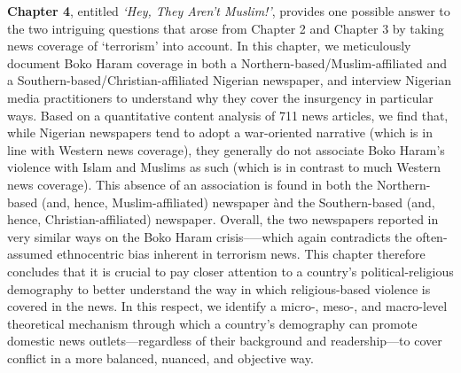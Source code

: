 \textbf{Chapter 4}, entitled \textit{`Hey, They Aren't Muslim!'}, provides one possible answer to the two intriguing questions that arose from Chapter 2 and Chapter 3 by taking news coverage of `terrorism' into account. In this chapter, we meticulously document Boko Haram coverage in both a Northern-based/Muslim-affiliated and a Southern-based/Christian-affiliated Nigerian newspaper, and interview Nigerian media practitioners to understand why they cover the insurgency in particular ways. Based on a quantitative content analysis of 711 news articles, we find that, while Nigerian newspapers tend to adopt a war-oriented narrative (which is in line with Western news coverage), they generally do not associate Boko Haram's violence with Islam and Muslims as such (which is in contrast to much Western news coverage). This absence of an association is found in both the Northern-based (and, hence, Muslim-affiliated) newspaper ànd the Southern-based (and, hence, Christian-affiliated) newspaper. Overall, the two newspapers reported in very similar ways on the Boko Haram crisis--—which again contradicts the often-assumed ethnocentric bias inherent in terrorism news. This chapter therefore concludes that it is crucial to pay closer attention to a country’s political-religious demography to better understand the way in which religious-based violence is covered in the news. In this respect, we identify a micro-, meso-, and macro-level theoretical mechanism through which a country’s demography can promote domestic news outlets—regardless of their background and readership—to cover conflict in a more balanced, nuanced, and objective way.


